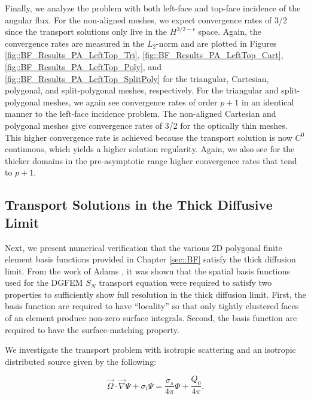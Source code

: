 Finally, we analyze the problem with both left-face and top-face incidence of the angular flux. For the non-aligned meshes, we expect convergence rates of 3/2 since the transport solutions only live in the $H^{3/2-\epsilon}$ space. Again, the convergence rates are measured in the $L_2$-norm and are plotted in Figures \ref{fig::BF_Results_PA_LeftTop_Tri}, \ref{fig::BF_Results_PA_LeftTop_Cart}, \ref{fig::BF_Results_PA_LeftTop_Poly}, and \ref{fig::BF_Results_PA_LeftTop_SplitPoly} for the triangular, Cartesian, polygonal, and split-polygonal meshes, respectively. For the triangular and split-polygonal meshes, we again see convergence rates of order $p+1$ in an identical manner to the left-face incidence problem. The non-aligned Cartesian and polygonal meshes give convergence rates of 3/2 for the optically thin meshes. This higher convergence rate is achieved because the transport solution is now $C^0$ continuous, which yields a higher solution regularity. Again, we also see for the thicker domains in the pre-asymptotic range higher convergence rates that tend to $p+1$.

\subsection{Transport Solutions in the Thick Diffusive Limit}
\label{sec::DSA_Results_TDL}

Next, we present numerical verification that the various 2D polygonal finite element basis functions provided in Chapter \ref{sec::BF} satisfy the thick diffusion limit. From the work of Adams \cite{adams2001dfem}, it was shown that the spatial basis functions used for the DGFEM $S_N$ transport equation were required to satisfy two properties to sufficiently show full resolution in the thick diffusion limit. First, the basis function are required to have ``locality'' so that only tightly clustered faces of an element produce non-zero surface integrals. Second, the basis function are required to have the surface-matching property.

We investigate the transport problem with isotropic scattering and an isotropic distributed source given by the following:

\begin{equation}
\label{eq::BF_Results_TDL_trans_eq}
\vec{\Omega} \cdot \vec{\nabla} \Psi + \sigma_t \Psi =   \frac{\sigma_s}{4 \pi} \Phi +  \frac{Q_0}{4 \pi}.
\end{equation}

